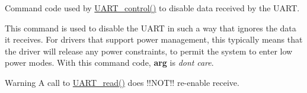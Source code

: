 Command code used by \hyperlink{_u_a_r_t_8h_a9de3c26cfe4ce6b7f350a6ea6e16801d}{U\+A\+R\+T\+\_\+control()} to disable data received by the U\+A\+R\+T. 

This command is used to disable the U\+A\+R\+T in such a way that ignores the data it receives. For drivers that support power management, this typically means that the driver will release any power constraints, to permit the system to enter low power modes. With this command code, {\bfseries arg} is {\itshape don\textquotesingle{}t} {\itshape care}.

\begin{DoxyWarning}{Warning}
A call to \hyperlink{_u_a_r_t_8h_a023152d57539cad94bdd813956013e73}{U\+A\+R\+T\+\_\+read()} does !!\+N\+O\+T!! re-\/enable receive. 
\end{DoxyWarning}
